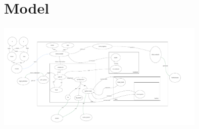 \documentclass{article}
\begin{document}
\section*{Model}
\begin{center}
    \includegraphics[width=0.75\textwidth]{src/IO.pdf}
  \end{center}
\end{document}
